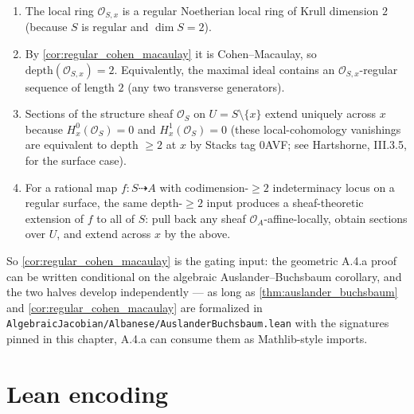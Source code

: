\begin{enumerate}
  \item The local ring \(\mathcal{O}_{S,x}\) is a regular Noetherian local ring of Krull
    dimension \(2\) (because \(S\) is regular and \(\dim S = 2\)).
  \item By \cref{cor:regular_cohen_macaulay} it is Cohen--Macaulay, so
    \(\text{depth}(\mathcal{O}_{S,x}) = 2\). Equivalently, the maximal ideal contains an
    \(\mathcal{O}_{S,x}\)-regular sequence of length \(2\) (any two transverse generators).
  \item Sections of the structure sheaf \(\mathcal{O}_S\) on \(U = S \setminus \{x\}\) extend
    uniquely across \(x\) because \(H^0_x(\mathcal{O}_S) = 0\) and
    \(H^1_x(\mathcal{O}_S) = 0\) (these local-cohomology vanishings are equivalent to depth
    \(\geq 2\) at \(x\) by Stacks tag 0AVF; see Hartshorne, III.3.5, for the surface case).
  \item For a rational map \(f : S \dashrightarrow A\) with codimension-\(\geq 2\) indeterminacy
    locus on a regular surface, the same depth-\(\geq 2\) input produces a sheaf-theoretic
    extension of \(f\) to all of \(S\): pull back any sheaf \(\mathcal{O}_A\)-affine-locally,
    obtain sections over \(U\), and extend across \(x\) by the above.
\end{enumerate}

So \cref{cor:regular_cohen_macaulay} is the gating input: the geometric A.4.a
proof can be written conditional on the algebraic Auslander--Buchsbaum corollary, and the
two halves develop independently --- as long as \cref{thm:auslander_buchsbaum} and
\cref{cor:regular_cohen_macaulay} are formalized in
\texttt{AlgebraicJacobian/Albanese/AuslanderBuchsbaum.lean} with the signatures pinned
in this chapter, A.4.a can consume them as Mathlib-style imports.

\section{Lean encoding}
\label{sec:ab_lean_encoding}

